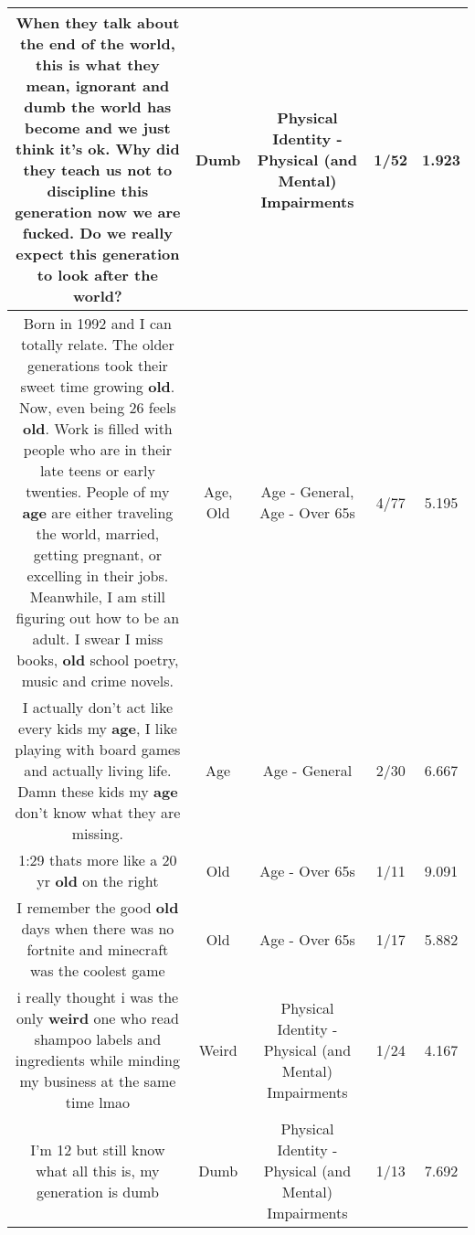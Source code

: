 \documentclass[11pt]{article}
\newlength\mylength
\begin{document}
\begin{center}
\begin{longtable}{|C{.65\mylength}|C{.30\mylength}|C{.12\mylength}|C{.12\mylength}|C{.12\mylength}|}
  \small When they talk about the end of the world, this is what they mean, ignorant and \textbf{dumb} the world has become and we just think it's ok. Why did they teach us not to discipline this generation now we are fucked. Do we really expect this generation to look after the world?\normalsize   & Dumb & Physical Identity - Physical (and Mental) Impairments & 1/52 & 1.923 \\  \hline
  \small Born in 1992 and I can totally relate. The older generations took their sweet time growing \textbf{old}. Now, even being 26 feels \textbf{old}. Work is filled with people who are in their late teens or early twenties. People of my \textbf{age} are either traveling the world, married, getting pregnant, or excelling in their jobs. Meanwhile, I am still figuring out how to be an adult. I swear I miss books, \textbf{old} school poetry, music and crime novels.\normalsize   & Age, Old & Age - General, Age - Over 65s & 4/77 & 5.195 \\  \hline
  \small I actually don't act like every kids my \textbf{age}, I like playing with board games and actually living life. Damn these kids my \textbf{age} don't know what they are missing.\normalsize   & Age & Age - General & 2/30 & 6.667 \\  \hline
  \small 1:29 thats more like a 20 yr \textbf{old} on the right\normalsize   & Old & Age - Over 65s & 1/11 & 9.091 \\  \hline
  \small I remember the good \textbf{old} days when there was no fortnite and minecraft was the coolest game\normalsize   & Old & Age - Over 65s & 1/17 & 5.882 \\  \hline
  \small i really thought i was the only \textbf{weird} one who read shampoo labels and ingredients while minding my business at the same time lmao\normalsize   & Weird & Physical Identity - Physical (and Mental) Impairments & 1/24 & 4.167 \\  \hline
  \small I'm 12 but still know what all this is, my generation is dumb\normalsize   & Dumb & Physical Identity - Physical (and Mental) Impairments & 1/13 & 7.692 \\  \hline

\end{longtable}
\end{center}
\end{document}
